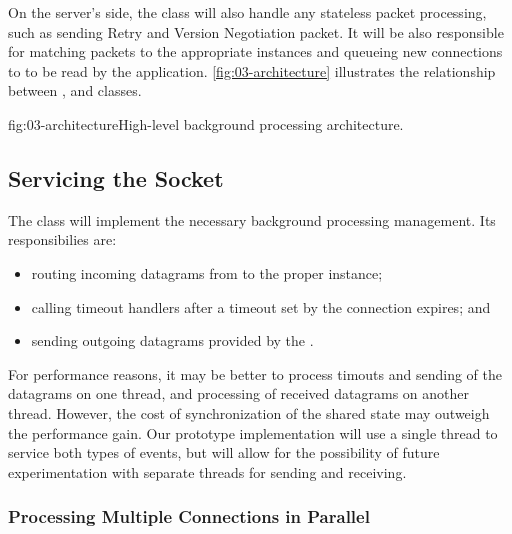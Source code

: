 On the server's side, the \QuicSocketContext{} class will also handle any stateless packet
processing, such as sending Retry and Version Negotiation packet. It will be also responsible for
matching packets to the appropriate \QuicConnection{} instances and queueing new connections to \QuicListener{} to be read by the application. \autoref{fig:03-architecture} illustrates the relationship between \QuicSocketContext{}, \QuicConnection{} and \QuicListener{} classes.

\begin{myFigure}{fig:03-architecture}{High-level background processing architecture.}

  

\end{myFigure}

\subsection{Servicing the Socket}

The \QuicSocketContext{} class will implement the necessary background processing management. Its
responsibilies are:

\begin{itemize}

  \item routing incoming datagrams from \Socket{} to the proper \QuicConnection{}
  instance;

  \item calling timeout handlers after a timeout set by the connection expires; and

  \item sending outgoing datagrams provided by the \QuicConnection{}.

\end{itemize}

For performance reasons, it may be better to process timouts and sending of the datagrams on one
thread, and processing of received datagrams on another thread. However, the cost of synchronization
of the shared state may outweigh the performance gain. Our prototype implementation will use a
single thread to service both types of events, but will allow for the possibility of future
experimentation with separate threads for sending and receiving.

\subsubsection{Processing Multiple Connections in Parallel}

